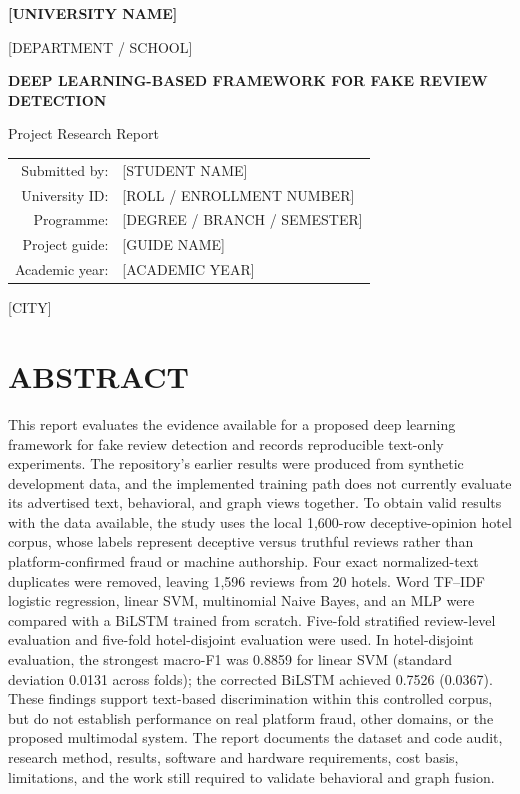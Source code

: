 \documentclass[12pt,a4paper]{report}
\begin{document}
\begin{titlepage}
\centering
\vspace*{1.2in}
{\Large \textbf{[UNIVERSITY NAME]}\par}
\vspace{0.25in}
{\large [DEPARTMENT / SCHOOL]\par}
\vspace{1.0in}
{\LARGE \textbf{DEEP LEARNING-BASED FRAMEWORK FOR FAKE REVIEW DETECTION}\par}
\vspace{0.4in}
{\Large Project Research Report\par}
\vspace{1.0in}
\begin{tabular}{rl}
Submitted by: & [STUDENT NAME] \\
University ID: & [ROLL / ENROLLMENT NUMBER] \\
Programme: & [DEGREE / BRANCH / SEMESTER] \\
Project guide: & [GUIDE NAME] \\
Academic year: & [ACADEMIC YEAR] \\
\end{tabular}
\vfill
{\large [CITY]\par}
\end{titlepage}

\chapter*{ABSTRACT}

This report evaluates the evidence available for a proposed deep learning framework for fake review detection and records reproducible text-only experiments. The repository's earlier results were produced from synthetic development data, and the implemented training path does not currently evaluate its advertised text, behavioral, and graph views together. To obtain valid results with the data available, the study uses the local 1,600-row deceptive-opinion hotel corpus, whose labels represent deceptive versus truthful reviews rather than platform-confirmed fraud or machine authorship. Four exact normalized-text duplicates were removed, leaving 1,596 reviews from 20 hotels. Word TF--IDF logistic regression, linear SVM, multinomial Naive Bayes, and an MLP were compared with a BiLSTM trained from scratch. Five-fold stratified review-level evaluation and five-fold hotel-disjoint evaluation were used. In hotel-disjoint evaluation, the strongest macro-F1 was 0.8859 for linear SVM (standard deviation 0.0131 across folds); the corrected BiLSTM achieved 0.7526 (0.0367). These findings support text-based discrimination within this controlled corpus, but do not establish performance on real platform fraud, other domains, or the proposed multimodal system. The report documents the dataset and code audit, research method, results, software and hardware requirements, cost basis, limitations, and the work still required to validate behavioral and graph fusion.
\end{document}
